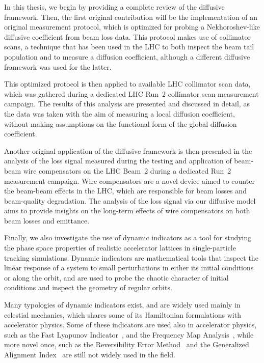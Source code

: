 In this thesis, we begin by providing a complete review of the diffusive framework. Then, the first original contribution will be the implementation of an original measurement protocol, which is optimized for probing a Nekhoroshev-like diffusive coefficient from beam loss data. This protocol makes use of collimator scans, a technique that has been used in the LHC to both inspect the beam tail population and to measure a diffusion coefficient, although a different diffusive framework was used for the latter.

This optimized protocol is then applied to available LHC collimator scan data, which was gathered during a dedicated LHC Run~2 collimator scan measurement campaign. The results of this analysis are presented and discussed in detail, as the data was taken with the aim of measuring a local diffusion coefficient, without making assumptions on the functional form of the global diffusion coefficient.

Another original application of the diffusive framework is then presented in the analysis of the loss signal measured during the testing and application of beam-beam wire compensators on the LHC Beam~2 during a dedicated Run~2 measurement campaign. Wire compensators are a novel device aimed to counter the beam-beam effects in the LHC, which are responsible for beam losses and beam-quality degradation. The analysis of the loss signal via our diffusive model aims to provide insights on the long-term effects of wire compensators on both beam losses and emittance. 

Finally, we also investigate the use of dynamic indicators as a tool for studying the phase space properties of realistic accelerator lattices in single-particle tracking simulations. Dynamic indicators are mathematical tools that inspect the linear response of a system to small perturbations in either its initial conditions or along the orbit, and are used to probe the chaotic character of initial conditions and inspect the geometry of regular orbits. 

Many typologies of dynamic indicators exist, and are widely used mainly in celestial mechanics, which shares some of its Hamiltonian formulations with accelerator physics. Some of these indicators are used also in accelerator physics, such as the Fast Lyapunov Indicator~\cite{Froeschle1997, SZEZECH2005394}, and the Frequency Map Analysis~\cite{Laskar1999,Laskar2003}, while more novel once, such as the Reversibility Error Method~\cite{Panichi2016,Panichi2017} and the Generalized Alignment Index~\cite{Bountis2007,Skokos2015} are still not widely used in the field.

